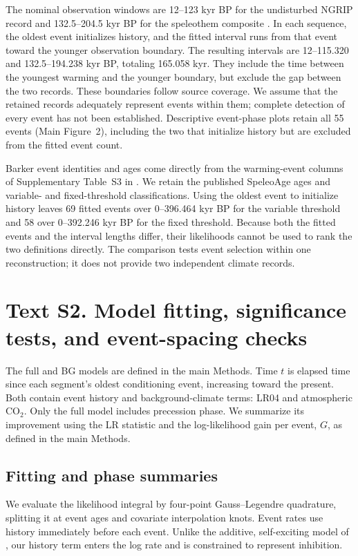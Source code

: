 \documentclass[11pt]{article}
\begin{document}
The nominal observation windows are 12--123 kyr BP for the undisturbed NGRIP record \citep{ngrip2004high} and 132.5--204.5 kyr BP for the speleothem composite \citep{held2024dansgaard}. In each sequence, the oldest event initializes history, and the fitted interval runs from that event toward the younger observation boundary. The resulting intervals are 12--115.320 and 132.5--194.238 kyr BP, totaling 165.058 kyr. They include the time between the youngest warming and the younger boundary, but exclude the gap between the two records. These boundaries follow source coverage. We assume that the retained records adequately represent events within them; complete detection of every event has not been established. Descriptive event-phase plots retain all 55 events (Main Figure~2), including the two that initialize history but are excluded from the fitted event count.

Barker event identities and ages come directly from the warming-event columns of Supplementary Table~S3 in \citet{barker2011800}. We retain the published SpeleoAge ages and variable- and fixed-threshold classifications. Using the oldest event to initialize history leaves 69 fitted events over 0--396.464 kyr BP for the variable threshold and 58 over 0--392.246 kyr BP for the fixed threshold. Because both the fitted events and the interval lengths differ, their likelihoods cannot be used to rank the two definitions directly. The comparison tests event selection within one reconstruction; it does not provide two independent climate records.


\section*{Text S2. Model fitting, significance tests, and event-spacing checks}

The full and BG models are defined in the main Methods. Time $t$ is elapsed time since each segment's oldest conditioning event, increasing toward the present. Both contain event history and background-climate terms: LR04 and atmospheric CO$_2$. Only the full model includes precession phase. We summarize its improvement using the LR statistic and the log-likelihood gain per event, $G$, as defined in the main Methods.

\subsection*{Fitting and phase summaries}

We evaluate the likelihood integral by four-point Gauss--Legendre quadrature, splitting it at event ages and covariate interpolation knots. Event rates use history immediately before each event. Unlike the additive, self-exciting model of \citet{hawkes1971spectra}, our history term enters the log rate and is constrained to represent inhibition.
\end{document}
